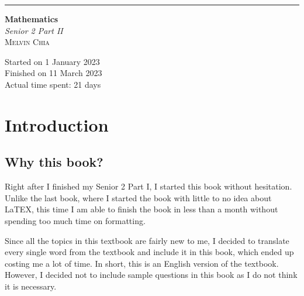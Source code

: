 \documentclass{report}
\begin{document}
\newcommand{\sol}[1]{

  \noindent \textbf{Sol.}
}
\newcommand{\prooff}[1]{

  \noindent \textbf{Proof.}
}

\newenvironment{cequation}{
  \makeatletter
  \setbool{@fleqn}{false}
  \makeatother
  \begin{equation*}
    }{\end{equation*}}

\begin{titlepage}
  \raggedleft{}
  \rule{1pt}{\textheight}
  \hspace{0.02\textwidth}
  \parbox[b]{0.75\textwidth}{

  {\fontsize{40}{60}\selectfont\bfseries Mathematics}\\[2\baselineskip]
  {\huge\textit{Senior 2 Part II}}\\[4\baselineskip]
  {\Large\textsc{Melvin Chia}}

  \vspace{0.5\textheight}

  {\noindent Started on 1 January 2023}\\[\baselineskip]
  {\noindent Finished on 11 March 2023}\\[\baselineskip]
  {\noindent Actual time spent: 21 days}\\[\baselineskip]}

\end{titlepage}

\chapter*{Introduction}
 

\doublespacing{}
\section*{Why this book?}

Right after I finished my Senior 2 Part I, I started this book without
hesitation. Unlike the last book, where I started the book with little to no
idea about LaTEX, this time I am able to finish the book in less than a month
without spending too much time on formatting.

Since all the topics in this textbook are fairly new to me, I decided to
translate every single word from the textbook and include it in this book,
which ended up costing me a lot of time. In short, this is an English version
of the textbook. However, I decided not to include sample questions in this
book as I do not think it is necessary.
\end{document}
